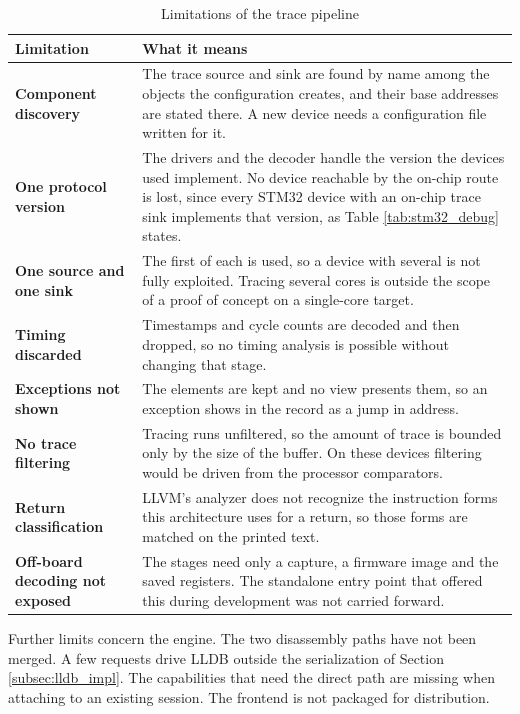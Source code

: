 \begin{table}[htbp]
    \centering
    \caption{Limitations of the trace pipeline}
    \label{tab:trace_limits_tab}
    \begin{tabularx}{\linewidth}{| @{}>{\hsize\bfseries}Y | >{\hsize}Y@{} |}
        \hline
        Limitation & \textbf{What it means} \\
        \hline
        Component discovery & The trace source and sink are found by name among the objects the configuration creates, and their base addresses are stated there. A new device needs a configuration file written for it. \\
        \hline
        One protocol version & The drivers and the decoder handle the version the devices used implement. No device reachable by the on-chip route is lost, since every STM32 device with an on-chip trace sink implements that version, as Table \ref{tab:stm32_debug} states. \\
        \hline
        One source and one sink & The first of each is used, so a device with several is not fully exploited. Tracing several cores is outside the scope of a proof of concept on a single-core target. \\
        \hline
        Timing discarded & Timestamps and cycle counts are decoded and then dropped, so no timing analysis is possible without changing that stage. \\
        \hline
        Exceptions not shown & The elements are kept and no view presents them, so an exception shows in the record as a jump in address. \\
        \hline
        No trace filtering & Tracing runs unfiltered, so the amount of trace is bounded only by the size of the buffer. On these devices filtering would be driven from the processor comparators. \\
        \hline
        Return classification & LLVM's analyzer does not recognize the instruction forms this architecture uses for a return, so those forms are matched on the printed text. \\
        \hline
        Off-board decoding not exposed & The stages need only a capture, a firmware image and the saved registers. The standalone entry point that offered this during development was not carried forward. \\
        \hline
    \end{tabularx}
\end{table}

Further limits concern the engine. The two disassembly paths have not been merged. A few requests drive LLDB outside the serialization of Section \ref{subsec:lldb_impl}. The capabilities that need the direct path are missing when attaching to an existing session. The frontend is not packaged for distribution.

